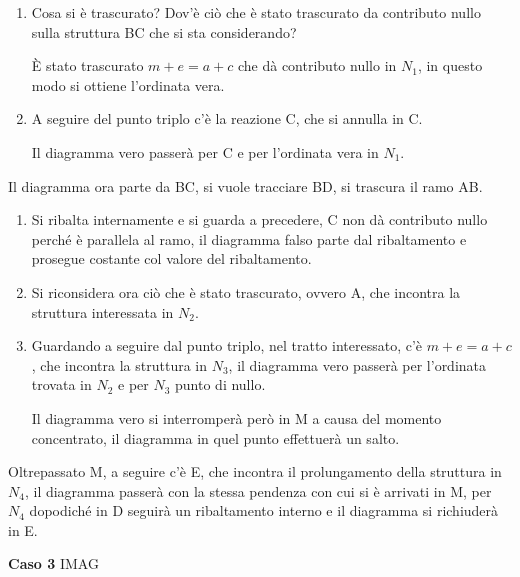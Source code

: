 \documentclass{article}
\begin{document}
\begin{adjustwidth}{2in}{}
\begin{enumerate}
	\item Cosa si è trascurato? Dov'è ciò che è stato trascurato da contributo nullo sulla struttura BC che si sta considerando? \newline 
	
	È stato trascurato $m+e = a+c$ che dà contributo nullo in $N_1$, in questo modo si ottiene l'ordinata vera. 
	
	\item A seguire del punto triplo c'è la reazione C, che si annulla in C. 
	
	Il diagramma vero passerà per C e per l'ordinata vera in $N_1$.
\end{enumerate}

Il diagramma ora parte da BC, si vuole tracciare BD, si trascura il ramo AB. 

\begin{enumerate}
	\item Si ribalta internamente e si guarda a precedere, C non dà contributo nullo perché è parallela al ramo, il diagramma falso parte dal ribaltamento e prosegue costante col valore del ribaltamento. 
	
	\item Si riconsidera ora ciò che è stato trascurato, ovvero A, che incontra la struttura interessata in $N_2$. 
	
	\item Guardando a seguire dal punto triplo, nel tratto interessato, c'è $m+e=a+c$, che incontra la struttura in $N_3$, il diagramma vero passerà per l'ordinata trovata in $N_2$ e per $N_3$ punto di nullo. \newline 
	
	Il diagramma vero si interromperà però in M a causa del momento concentrato, il diagramma in quel punto effettuerà un salto. 
\end{enumerate} 

Oltrepassato M, a seguire c'è E, che incontra il prolungamento della struttura in $N_4$, il diagramma passerà con la stessa pendenza con cui si è arrivati in M, per $N_4$ dopodiché in D seguirà un ribaltamento interno e il diagramma si richiuderà in E. \newline 

\newpage

\textbf{Caso 3}\newline 
IMAG


\end{adjustwidth}
\end{document}
